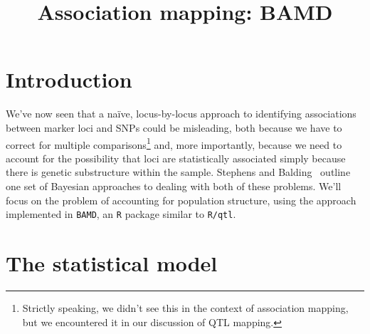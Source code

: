 \documentclass[12pt]{article}
\title{Association mapping: BAMD}
\begin{document}
\maketitle

\thispagestyle{first}

\section*{Introduction}

We've now seen that a na{\"i}ve, locus-by-locus approach to
identifying associations between marker loci and SNPs could be
misleading, both because we have to correct for multiple
comparisons\footnote{Strictly speaking, we didn't see this in the
  context of association mapping, but we encountered it in our
  discussion of QTL mapping.} and, more importantly, because we need
to account for the possibility that loci are statistically associated
simply because there is genetic substructure within the
sample. Stephens and Balding~\cite{Stephens-Balding-2009} outline one
set of Bayesian approaches to dealing with both of these
problems. We'll focus on the problem of accounting for population
structure, using the approach implemented in {\tt BAMD}, an {\tt R}
package similar to {\tt R/qtl}.

\section*{The statistical model}
\end{document}
